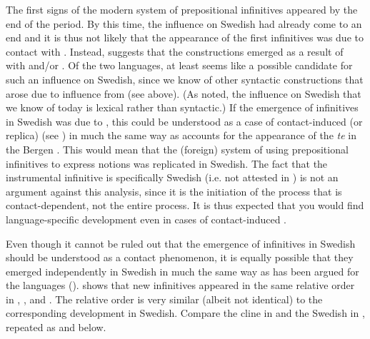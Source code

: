 \documentclass[output=paper]{langscibook}
\begin{document}
The first signs of the modern system of prepositional  infinitives appeared by the end of the  period. By this time, the  influence on Swedish had already come to an end and it is thus not likely that the appearance of the first  infinitives was due to contact with . Instead, \citet{Holm1967} suggests that the constructions emerged as a result of  with  and/or . Of the two languages, at least  seems like a possible candidate for such an influence on Swedish, since we know of other syntactic constructions that arose due to influence from  (see  above). (As noted, the  influence on Swedish that we know of today is lexical rather than syntactic.) If the emergence of  infinitives in Swedish was due to , this could be understood as a case of contact-induced (or replica)  (see \citealt{HeineKuteva2003, HeineKuteva2005}) in much the same way as \citet{Nesse2002} accounts for the appearance of the  \textit{te} in the  Bergen . This would mean that the (foreign) system of using prepositional infinitives to express  notions was replicated in Swedish. The fact that the instrumental infinitive is specifically Swedish (i.e. not attested in ) is not an argument against this analysis, since it is the initiation of the  process that is contact-dependent, not the entire process. It is thus expected that you would find language-specific development even in cases of contact-induced . 



Even though it cannot be ruled out that the emergence of  infinitives in Swedish should be understood as a contact phenomenon, it is equally possible that they emerged independently in Swedish in much the same way as has been argued for the  languages (\citealt{Schulte2007Prepositional, Schulte2007What}). \citet{Schulte2007Prepositional, Schulte2007What} shows that new  infinitives appeared in the same relative order in , , and . The relative order is very similar (albeit not identical) to the corresponding development in Swedish. Compare the  cline in  and the Swedish in , repeated as  and  below. 
\end{document}
